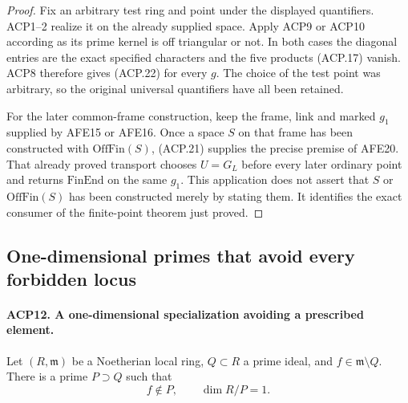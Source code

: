 \begin{proof}
Fix an arbitrary test ring and point under the displayed
quantifiers.  ACP1--2 realize it on the already supplied space.
Apply ACP9 or ACP10 according as its prime kernel is off
triangular or not.  In both cases the diagonal entries are
the exact specified characters and the five products (ACP.17)
vanish.  ACP8 therefore gives (ACP.22) for every \(g\).
The choice of the test point was arbitrary, so the original
universal quantifiers have all been retained.

For the later common-frame construction, keep the frame,
link and marked \(g_1\) supplied by AFE15 or AFE16.
Once a space \(S\) on that frame has been constructed with
\(\mathrm{OffFin}(S)\), (ACP.21) supplies the precise premise
of AFE20.  That already proved transport chooses
\(U=G_L\) before every later ordinary point and returns
\(\mathrm{FinEnd}\) on the same \(g_1\).  This application
does not assert that \(S\) or \(\mathrm{OffFin}(S)\) has been
constructed merely by stating them.  It identifies the exact
consumer of the finite-point theorem just proved.
\end{proof}

\subsection{One-dimensional primes that avoid every forbidden locus}

\paragraph{ACP12. A one-dimensional specialization avoiding a prescribed element.}
\label{claim:ACP12}
Let \((R,\mathfrak m)\) be a Noetherian local ring,
\(Q\subset R\) a prime ideal, and \(f\in\mathfrak m\setminus Q\).
There is a prime \(P\supset Q\) such that
\[
                    f\notin P,\qquad \dim R/P=1.
                                                        \tag{ACP.23}
\]

